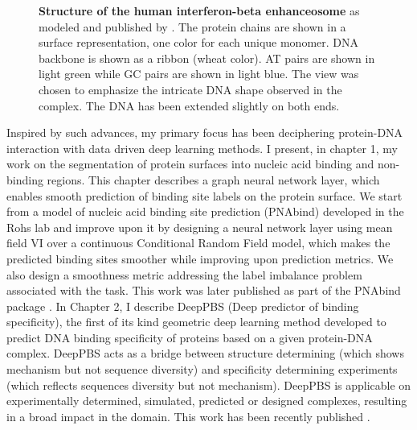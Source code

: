 \begin{center}
    \begin{figure}[H]
        \caption[Structure of the human interferon-beta enhanceosome]{\textbf{ Structure of the human interferon-beta enhanceosome} as modeled and published by \citet{panne2007atomic}. The protein chains are shown in a surface representation, one color for each unique monomer. DNA backbone is shown as a ribbon (wheat color). AT pairs are shown in light green while GC pairs are shown in light blue. The view was chosen to emphasize the intricate DNA shape observed in the complex. The DNA has been extended slightly on both ends.}
  \label{fig:mmc2}
\end{figure}
\end{center}

Inspired by such advances, my primary focus has been deciphering protein-DNA interaction with data driven deep learning methods. I present, in chapter 1,
my work on the segmentation of protein surfaces into nucleic acid binding and non-binding regions. This chapter describes a graph neural network layer, which enables smooth prediction of binding site labels on the protein surface. We start from a model of nucleic acid binding site
prediction (PNAbind) developed in the Rohs lab and improve upon it by designing a neural network layer using mean field
VI over a continuous Conditional Random Field model, which makes the predicted binding sites smoother while improving upon prediction metrics. We also design a smoothness metric addressing the label imbalance problem associated with the task. This work was later published as part of the PNAbind package \citep{Sagendorf2024}.
In Chapter 2, I describe DeepPBS (Deep predictor of binding specificity), the first of its kind geometric deep learning method developed to predict DNA binding specificity of proteins based on a given protein-DNA complex. DeepPBS acts as a bridge between structure determining (which shows mechanism but not sequence diversity) and specificity determining experiments (which reflects sequences diversity but not mechanism). DeepPBS is applicable on experimentally determined, simulated, predicted or designed complexes, resulting in a broad impact in the domain. This work has been recently published \citep{Mitra2024}.

